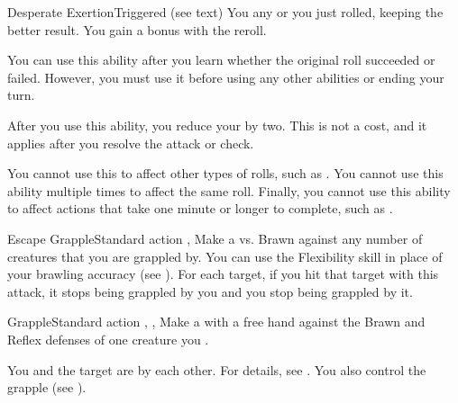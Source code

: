   \begin{triggeredability}{Desperate Exertion}{Triggered (see text)}
    \rankline
    You  any  or  you just rolled, keeping the better result.
    You gain a  bonus with the reroll.

    You can use this ability after you learn whether the original roll succeeded or failed.
    However, you must use it before using any other abilities or ending your turn.

    After you use this ability, you reduce your  by two.
    This is not a cost, and it applies after you resolve the attack or check.

    You cannot use this to affect other types of rolls, such as .
    You cannot use this ability multiple times to affect the same roll.
    Finally, you cannot use this ability to affect actions that take one minute or longer to complete, such as .
  \end{triggeredability}

  \begin{activeability}{Escape Grapple}{Standard action}
    \abilitytags \atBrawling, \atPhysical
    \rankline
    Make a  vs. Brawn against any number of creatures that you are grappled by.
    You can use the Flexibility skill in place of your brawling accuracy (see ).
    For each target, if you hit that target with this attack, it stops being grappled by you and you stop being grappled by it.
  \end{activeability}

  \begin{activeability}{Grapple}{Standard action}
    \abilitytags \atBrawling, \atPhysical, \atSizeBased
    \rankline
    Make a  with a free hand against the Brawn and Reflex defenses of one creature you .

    \hit You and the target are \grappled by each other.
    For details, see .
    \crit You also control the grapple (see ).
  \end{activeability}

